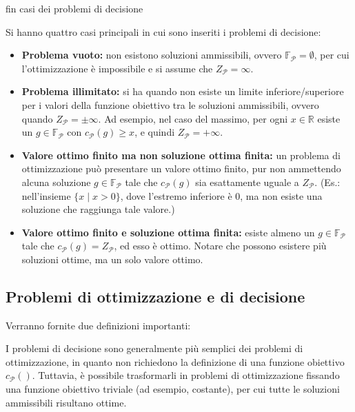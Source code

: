 fin casi dei problemi di decisione

Si hanno quattro casi principali in cui sono inseriti i problemi di decisione:
\begin{itemize}
  \item \textbf{Problema vuoto:} non esistono soluzioni ammissibili, ovvero $\mathbb{F}_\mathcal{P} = \emptyset$, per cui l’ottimizzazione è impossibile e si assume che $Z_\mathcal{P} = \infty$.
  \item \textbf{Problema illimitato:} si ha quando non esiste un limite inferiore/superiore per i valori della funzione obiettivo tra le soluzioni ammissibili, ovvero quando $Z_\mathcal{P} = \pm\infty$. Ad esempio, nel caso del massimo, per ogni $x \in \mathbb{R}$ esiste un $g \in \mathbb{F}_\mathcal{P}$ con $c_\mathcal{P}(g) \ge x$, e quindi $Z_\mathcal{P} = +\infty$.
  \item \textbf{Valore ottimo finito ma non soluzione ottima finita:} un problema di ottimizzazione può presentare un valore ottimo finito, pur non ammettendo alcuna soluzione $g \in \mathbb{F}_\mathcal{P}$ tale che $c_\mathcal{P}(g)$ sia esattamente uguale a $Z_\mathcal{P}$. (Es.: nell’insieme $\{ x \mid x > 0 \}$, dove l’estremo inferiore è 0, ma non esiste una soluzione che raggiunga tale valore.)
  \item \textbf{Valore ottimo finito e soluzione ottima finita:} esiste almeno un $g \in \mathbb{F}_\mathcal{P}$ tale che $c_\mathcal{P}(g) = Z_\mathcal{P}$, ed esso è ottimo. Notare che possono esistere più soluzioni ottime, ma un solo valore ottimo.
\end{itemize}

\subsection{ Problemi di ottimizzazione e di decisione}

Verranno fornite due definizioni importanti:



I problemi di decisione sono generalmente più semplici dei problemi di ottimizzazione, in quanto non richiedono la definizione di una funzione obiettivo $c_\mathcal{P}()$. Tuttavia, è possibile trasformarli in problemi di ottimizzazione fissando una funzione obiettivo triviale (ad esempio, costante), per cui tutte le soluzioni ammissibili risultano ottime.

